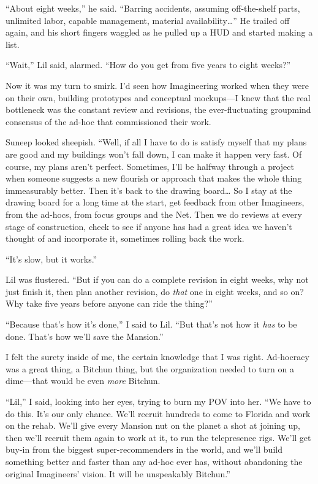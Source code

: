 “About eight weeks,” he said. “Barring accidents, assuming
off-the-shelf parts, unlimited labor, capable management, material
availability…” He trailed off again, and his short fingers waggled
as he pulled up a HUD and started making a list.

“Wait,” Lil said, alarmed. “How do you get from five years to eight
weeks?”

Now it was my turn to smirk. I'd seen how Imagineering worked when
they were on their own, building prototypes and conceptual
mockups—I knew that the real bottleneck was the constant review and
revisions, the ever-fluctuating groupmind consensus of the ad-hoc
that commissioned their work.

Suneep looked sheepish. “Well, if all I have to do is satisfy
myself that my plans are good and my buildings won't fall down, I
can make it happen very fast. Of course, my plans aren't perfect.
Sometimes, I'll be halfway through a project when someone suggests
a new flourish or approach that makes the whole thing immeasurably
better. Then it's back to the drawing board… So I stay at the
drawing board for a long time at the start, get feedback from other
Imagineers, from the ad-hocs, from focus groups and the Net. Then
we do reviews at every stage of construction, check to see if
anyone has had a great idea we haven't thought of and incorporate
it, sometimes rolling back the work.

“It's slow, but it works.”

Lil was flustered. “But if you can do a complete revision in eight
weeks, why not just finish it, then plan another revision, do
\emph{that} one in eight weeks, and so on? Why take five years
before anyone can ride the thing?”

“Because that's how it's done,” I said to Lil. “But that's not how
it \emph{has} to be done. That's how we'll save the Mansion.”

I felt the surety inside of me, the certain knowledge that I was
right. Ad-hocracy was a great thing, a Bitchun thing, but the
organization needed to turn on a dime—that would be even
\emph{more} Bitchun.

“Lil,” I said, looking into her eyes, trying to burn my POV into
her. “We have to do this. It's our only chance. We'll recruit
hundreds to come to Florida and work on the rehab. We'll give every
Mansion nut on the planet a shot at joining up, then we'll recruit
them again to work at it, to run the telepresence rigs. We'll get
buy-in from the biggest super-recommenders in the world, and we'll
build something better and faster than any ad-hoc ever has, without
abandoning the original Imagineers' vision. It will be unspeakably
Bitchun.”

